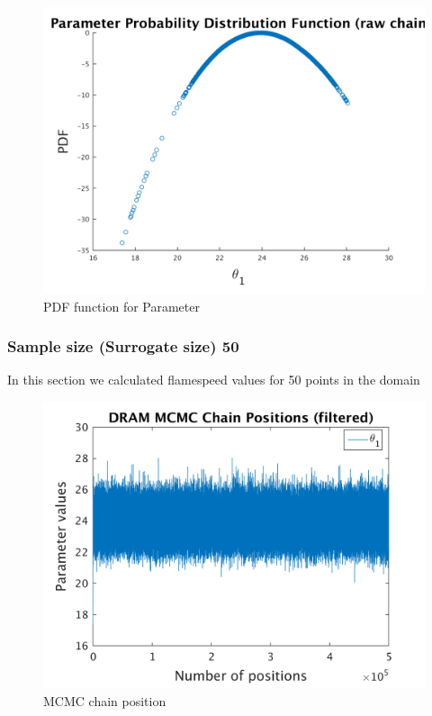 \begin{figure}[H]
  
  \centering
   \includegraphics[scale=0.75]{100_results/outputData_20/ip_logLike_unified}
   \caption{PDF function for Parameter }
\end{figure}


\subsubsection{Sample size (Surrogate size) 50 }


In this section we calculated flamespeed values for 50 points in the domain 
\begin{figure}[H]
  
  \centering
   \includegraphics[scale=0.75]{100_results/outputData_50/simple_ip_chain_pos_filt}
   \caption{MCMC chain position }
\end{figure}


